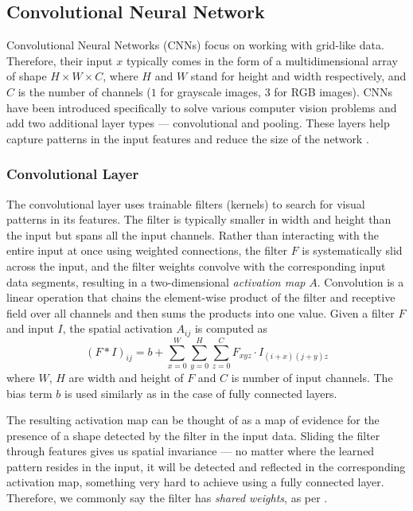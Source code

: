 \subsection*{Convolutional Neural Network}
Convolutional Neural Networks (CNNs) focus on working with grid-like data.
Therefore, their input $x$ typically comes in the form of a multidimensional array of shape $H \times W \times C$, where $H$ and $W$ stand for height and width respectively, and $C$ is the number of channels ($1$ for grayscale images, $3$ for RGB images).
CNNs have been introduced specifically to solve various computer vision problems and add two additional layer types --- convolutional and pooling.
These layers help capture patterns in the input features and reduce the size of the network \cite{cnns}. 

\subsubsection{Convolutional Layer}

The convolutional layer uses trainable filters (kernels) to search for visual patterns in its features.
The filter is typically smaller in width and height than the input but spans all the input channels.
Rather than interacting with the entire input at once using weighted connections, the filter $F$ is systematically slid across the input, and the filter weights convolve with the corresponding input data segments, resulting in a two-dimensional \emph{activation map} $A$.
Convolution is a linear operation that chains the element-wise product of the filter and receptive field over all channels and then sums the products into one value. Given a filter $F$ and input $I$, the spatial activation $A_{ij}$ is computed as 
\begin{equation}
    (F * I)_{ij} = b + \sum_{x=0}^{W} \sum_{y=0}^{H} \sum_{z=0}^{C} F_{xyz} \cdot I_{(i+x)(j+y)z}
\end{equation}
where $W$, $H$ are width and height of $F$ and $C$ is number of input channels. The bias term $b$ is used similarly as in the case of fully connected layers.

The resulting activation map can be thought of as a map of evidence for the presence of a shape detected by the filter in the input data.
Sliding the filter through features gives us spatial invariance --- no matter where the learned pattern resides in the input, it will be detected and reflected in the corresponding activation map, something very hard to achieve using a fully connected layer.
Therefore, we commonly say the filter has \emph{shared weights}, as per \cite{goodfellow}.

